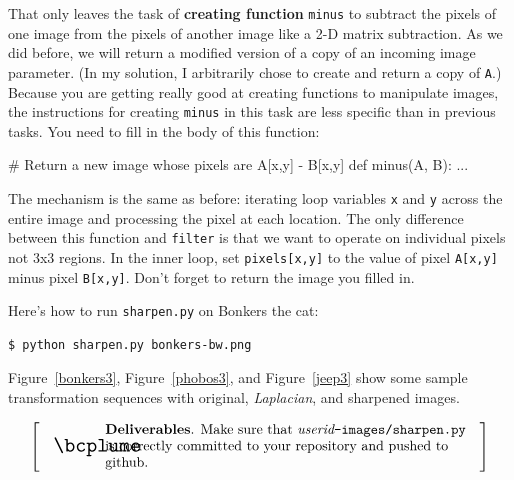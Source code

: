 \documentclass[titlepage]{tufte-book}
\makeatletter
\newcommand{\figref}[1]{Figure~\ref{#1}}
\newenvironment{callout}[1]{
\[
  \left[
      \begin{tabular}{@{\quad}m{.05\textwidth}@{\qquad}m{.75\textwidth}@{\quad}}
        \scalebox{1.5}{#1} & 
          \raggedright%
}
{
      \end{tabular}
    \right]
\]
}
\makeatother
\begin{document}
That only leaves the task of {\bf creating function} {\tt minus} to subtract the pixels of one image from the pixels of another image like a 2-D matrix subtraction.  As we did before, we will return a modified version of a copy of an incoming image parameter. (In my solution, I arbitrarily chose to create and return a copy of {\tt A}.) Because you are getting really good at creating functions to manipulate images, the instructions for creating {\tt minus} in this  task are less specific than in previous tasks.  You need to fill in the body of this function:
 
\begin{pyverbatim}
# Return a new image whose pixels are A[x,y] - B[x,y]
def minus(A, B):
	...
\end{pyverbatim}

The mechanism is the same as before: iterating loop variables {\tt x} and {\tt y} across the entire image and processing the pixel at each location. The only difference between this function and {\tt filter} is that we want to operate on individual pixels not 3x3 regions.  In the inner loop, set {\tt pixels[x,y]} to the value of pixel {\tt A[x,y]} minus pixel {\tt B[x,y]}. Don't forget to return the image you filled in.

Here's how to run {\tt sharpen.py} on Bonkers the cat:

\begin{lstlisting}[style=BashInputStyle]
$ python sharpen.py bonkers-bw.png
\end{lstlisting}

\noindent \figref{bonkers3}, \figref{phobos3}, and \figref{jeep3} show some sample transformation sequences with original, {\em Laplacian}, and sharpened images.

\begin{callout}{\bcplume}
{\bf Deliverables}. Make sure that {\em userid}{\tt -images/sharpen.py} is correctly committed to your repository and pushed to github. 
\end{callout}
\end{document}
